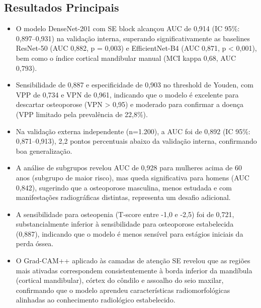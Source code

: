 \subsection{Resultados Principais}
\begin{itemize}
  \item O modelo DenseNet-201 com SE block alcançou AUC de 0,914
        (IC 95\%: 0,897--0,931) na validação interna, superando
        significativamente as baselines ResNet-50 (AUC 0,882,
        p = 0,003) e EfficientNet-B4 (AUC 0,871, p < 0,001), bem
        como o índice cortical mandibular manual (MCI kappa 0,68,
        AUC 0,793).
  \item Sensibilidade de 0,887 e especificidade de 0,903 no threshold
        de Youden, com VPP de 0,734 e VPN de 0,961, indicando que
        o modelo é excelente para descartar osteoporose (VPN > 0,95)
        e moderado para confirmar a doença (VPP limitado pela
        prevalência de 22,8\%).
  \item Na validação externa independente (n=1.200), a AUC foi de
        0,892 (IC 95\%: 0,871--0,913), 2,2 pontos percentuais abaixo
        da validação interna, confirmando boa generalização.
  \item A análise de subgrupos revelou AUC de 0,928 para mulheres
        acima de 60 anos (subgrupo de maior risco), mas queda
        significativa para homens (AUC 0,842), sugerindo que a
        osteoporose masculina, menos estudada e com manifestações
        radiográficas distintas, representa um desafio adicional.
  \item A sensibilidade para osteopenia (T-score entre -1,0 e -2,5)
        foi de 0,721, substancialmente inferior à sensibilidade para
        osteoporose estabelecida (0,887), indicando que o modelo é
        menos sensível para estágios iniciais da perda óssea.
  \item O Grad-CAM++ aplicado às camadas de atenção SE revelou que as
        regiões mais ativadas correspondem consistentemente à borda
        inferior da mandíbula (cortical mandibular), córtex do
        côndilo e assoalho do seio maxilar, confirmando que o modelo
        aprendeu características radiomorfológicas alinhadas ao
        conhecimento radiológico estabelecido.
\end{itemize}

